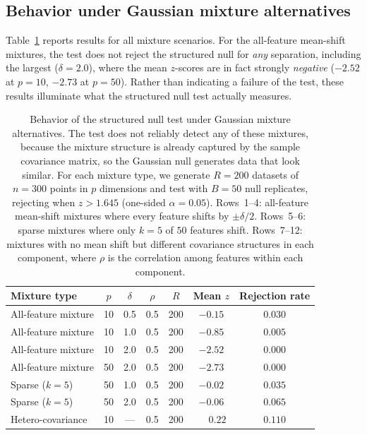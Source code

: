 \documentclass[hidelinks]{siamart251216}
\begin{document}
\subsection{Behavior under Gaussian mixture alternatives}\label{sec:sim-power}

Table~\ref{tab:sim-power} reports results for all mixture
scenarios. For the all-feature mean-shift mixtures, the test does not reject
the structured null for \emph{any} separation, including the
largest ($\delta = 2.0$), where the mean $z$-scores are in fact
strongly \emph{negative} ($-2.52$ at $p = 10$, $-2.73$ at $p = 50$).
Rather than indicating a failure of the test, these results illuminate
what the structured null test actually measures.

\begin{table}[t]
\caption{Behavior of the structured null test under Gaussian mixture
alternatives.  The test does not reliably detect any of these mixtures,
because the mixture structure is already captured by the sample
covariance matrix, so the Gaussian null generates data that look
similar.  For each mixture type, we generate $R = 200$ datasets of
$n = 300$ points in $p$ dimensions and test with $B = 50$ null
replicates, rejecting when $z > 1.645$ (one-sided $\alpha = 0.05$).
Rows~1--4: all-feature mean-shift mixtures where every feature shifts by
$\pm\delta/2$.  Rows~5--6: sparse mixtures where only $k = 5$ of
$50$ features shift.  Rows~7--12: mixtures with no mean shift but
different covariance structures in each component, where $\rho$ is the
correlation among features within each component.}
\label{tab:sim-power}
\begin{tabular}{@{}lcccccc@{}}
\toprule
\textbf{Mixture type} & $p$ & $\delta$ & $\rho$ & $R$ & \textbf{Mean} $z$ & \textbf{Rejection rate} \\
\midrule
All-feature mixture        & 10 & 0.5 & 0.5 & 200 & $-0.15$ & $0.030$ \\
All-feature mixture        & 10 & 1.0 & 0.5 & 200 & $-0.85$ & $0.005$ \\
All-feature mixture        & 10 & 2.0 & 0.5 & 200 & $-2.52$ & $0.000$ \\
All-feature mixture        & 50 & 2.0 & 0.5 & 200 & $-2.73$ & $0.000$ \\
\midrule
Sparse ($k=5$)    & 50 & 1.0 & 0.5 & 200 & $-0.02$ & $0.035$ \\
Sparse ($k=5$)    & 50 & 2.0 & 0.5 & 200 & $-0.06$ & $0.065$ \\
\midrule
Hetero-covariance      & 10 & ---  & 0.5 & 200 & $\phantom{-}0.22$ & $0.110$ \\

\end{tabular}
\end{table}
\end{document}
